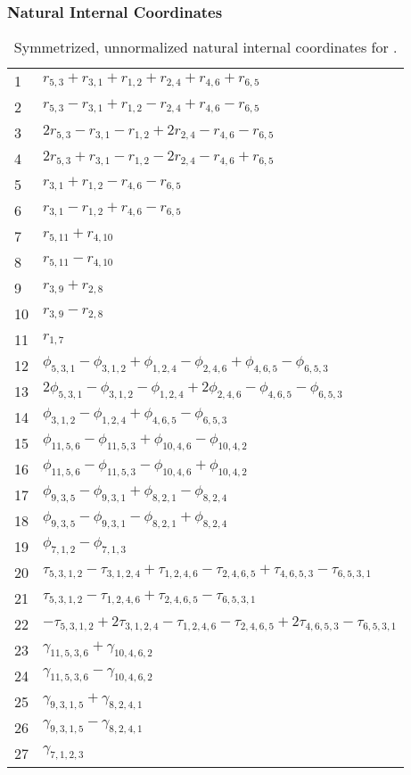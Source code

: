 \documentclass[10pt,oneside]{article}
\begin{document}
\subsubsection*{Natural Internal Coordinates}
\begin{table}[h!]
\centering
\caption{Symmetrized, unnormalized natural internal coordinates for .}
\small
\begin{tabular}{ll}
  1   & $r_{5,3} + r_{3,1} + r_{1,2} + r_{2,4} + r_{4,6} + r_{6,5}$ \\
  2   & $r_{5,3} - r_{3,1} + r_{1,2} - r_{2,4} + r_{4,6} - r_{6,5}$ \\
  3   & $2r_{5,3} - r_{3,1} - r_{1,2} + 2r_{2,4} - r_{4,6} - r_{6,5}$ \\
  4   & $2r_{5,3} + r_{3,1} - r_{1,2} - 2r_{2,4} - r_{4,6} + r_{6,5}$ \\
  5   & $r_{3,1} + r_{1,2} - r_{4,6} - r_{6,5}$ \\
  6   & $r_{3,1} - r_{1,2} + r_{4,6} - r_{6,5}$ \\
  7   & $r_{5,11} + r_{4,10}$ \\
  8   & $r_{5,11} - r_{4,10}$ \\
  9   & $r_{3,9} + r_{2,8}$ \\
  10  & $r_{3,9} - r_{2,8}$ \\
  11  & $r_{1,7}$ \\
  12  & $\phi_{5,3,1} - \phi_{3,1,2} + \phi_{1,2,4} - \phi_{2,4,6} + \phi_{4,6,5} - \phi_{6,5,3}$ \\
  13  & $2\phi_{5,3,1} - \phi_{3,1,2} - \phi_{1,2,4} + 2\phi_{2,4,6} - \phi_{4,6,5} - \phi_{6,5,3}$ \\
  14  & $\phi_{3,1,2} - \phi_{1,2,4} + \phi_{4,6,5} - \phi_{6,5,3}$ \\
  15  & $\phi_{11,5,6} - \phi_{11,5,3} + \phi_{10,4,6} - \phi_{10,4,2}$ \\
  16  & $\phi_{11,5,6} - \phi_{11,5,3} - \phi_{10,4,6} + \phi_{10,4,2}$ \\
  17  & $\phi_{9,3,5} - \phi_{9,3,1} + \phi_{8,2,1} - \phi_{8,2,4}$ \\
  18  & $\phi_{9,3,5} - \phi_{9,3,1} - \phi_{8,2,1} + \phi_{8,2,4}$ \\
  19  & $\phi_{7,1,2} - \phi_{7,1,3}$ \\
  20  & $\tau_{5,3,1,2} - \tau_{3,1,2,4} + \tau_{1,2,4,6} - \tau_{2,4,6,5} + \tau_{4,6,5,3} - \tau_{6,5,3,1}$ \\
  21  & $\tau_{5,3,1,2} - \tau_{1,2,4,6} + \tau_{2,4,6,5} - \tau_{6,5,3,1}$ \\
  22  & $-\tau_{5,3,1,2} + 2\tau_{3,1,2,4} - \tau_{1,2,4,6} - \tau_{2,4,6,5} + 2\tau_{4,6,5,3} - \tau_{6,5,3,1}$ \\
  23  & $\gamma_{11,5,3,6} + \gamma_{10,4,6,2}$ \\
  24  & $\gamma_{11,5,3,6} - \gamma_{10,4,6,2}$ \\
  25  & $\gamma_{9,3,1,5} + \gamma_{8,2,4,1}$ \\
  26  & $\gamma_{9,3,1,5} - \gamma_{8,2,4,1}$ \\
  27  & $\gamma_{7,1,2,3}$ \\
\end{tabular}
\end{table}
\end{document}
